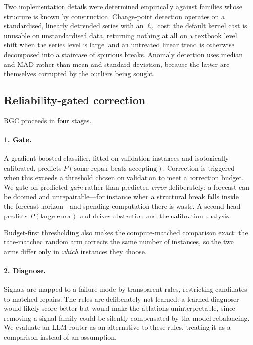 Two implementation details were determined empirically against families whose structure
is known by construction. Change-point detection operates on a standardised, linearly
detrended series with an $\ell_2$ cost: the default kernel cost is unusable on
unstandardised data, returning nothing at all on a textbook level shift when the series
level is large, and an untreated linear trend is otherwise decomposed into a staircase
of spurious breaks. Anomaly detection uses median and MAD rather than mean and standard
deviation, because the latter are themselves corrupted by the outliers being sought.

\subsection{Reliability-gated correction}

RGC proceeds in four stages.

\paragraph{1. Gate.}
A gradient-boosted classifier, fitted on validation instances and isotonically
calibrated, predicts $P(\text{some repair beats accepting})$. Correction is triggered
when this exceeds a threshold chosen on validation to meet a correction budget. We gate
on predicted \emph{gain} rather than predicted \emph{error} deliberately: a forecast can
be doomed and unrepairable---for instance when a structural break falls inside the
forecast horizon---and spending computation there is waste. A second head predicts
$P(\text{large error})$ and drives abstention and the calibration analysis.

Budget-first thresholding also makes the compute-matched comparison exact: the
rate-matched random arm corrects the same number of instances, so the two arms differ
only in \emph{which} instances they choose.

\paragraph{2. Diagnose.}
Signals are mapped to a failure mode by transparent rules, restricting candidates to
matched repairs. The rules are deliberately not learned: a learned diagnoser would
likely score better but would make the ablations uninterpretable, since removing a
signal family could be silently compensated by the model rebalancing. We evaluate an LLM
router as an alternative to these rules, treating it as a comparison instead of an
assumption.

